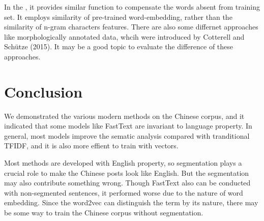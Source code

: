 In the \cite{DBLP:journals/corr/MikolovLS13}, it provides similar function to compensate the words absent from training set. 
It employs similarity of pre-trained word-embedding, rather than the similarity of n-gram characters features. 
There are also some differnet approaches like morphologically annotated data, whcih were introduced by Cotterell and Schütze (2015).
It may be a good topic to evaluate the difference of these approaches. 




\section{Conclusion}

We demonstrated the various modern methods on the Chinese corpus, and it indicated that some models like FastText are invariant to language property. 
In general, most models improve the sematic analysis compared with tranditional TFIDF, and it is also more effient to train with vectors.

Most methods are developed with English property, so segmentation plays a crucial role to make the Chinese posts look like English.
 But the segmentation may also contribute something wrong. Though FastText also can be conducted with non-segmented sentences, it performed worse due to the nature of word embedding.
Since the word2vec can distinguish the term by its nature, there may be some way to train the Chinese corpus without segmentation.

